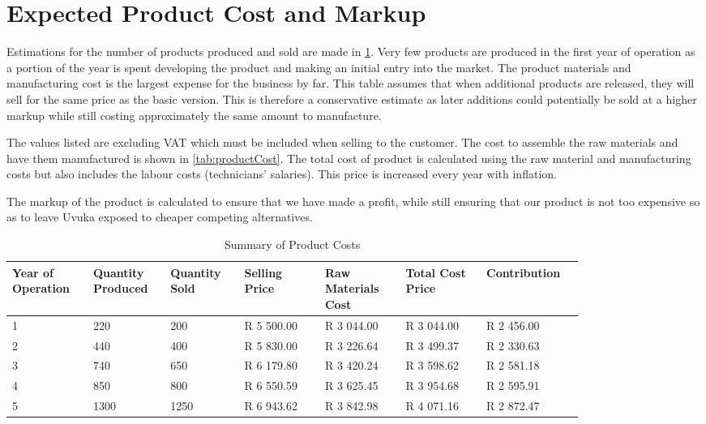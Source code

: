 \section{Expected Product Cost and Markup}
Estimations for the number of products produced and sold are made in \cref{tab:ProductSales}. Very few products are produced in the first year of operation as a portion of the year is spent developing the product and making an initial entry into the market. The product materials and manufacturing cost is the largest expense for the business by far. This table assumes that when additional products are released, they will sell for the same price as the basic version. This is therefore a conservative estimate as later additions could potentially be sold at a higher markup while still costing approximately the same amount to manufacture.

The values listed are excluding VAT which must be included when selling to the customer. The cost to assemble the raw materials and have them manufactured is shown in \cref{tab:productCost}. The total cost of product is calculated using the raw material and manufacturing costs but also includes the labour costs (technicians' salaries). This price is increased every year with inflation. 

The markup of the product is calculated to ensure that we have made a profit, while still ensuring that our product is not too expensive so as to leave Uvuka exposed to cheaper competing alternatives.

\begin{table}[htbp]
  \centering
  \caption{Summary of Product Costs}
    \begin{tabular}{p{0.12\linewidth}p{0.11\linewidth}p{0.11\linewidth}p{0.12\linewidth}p{0.12\linewidth}p{0.12\linewidth}p{0.12\linewidth}}
    \toprule
    \raggedright{Year of Operation} & Quantity Produced & Quantity Sold & Selling Price & Raw Materials Cost & \raggedright{Total Cost Price} & Contribution \\
    \midrule
    1     & 220   & 200   & R 5 500.00 & R 3 044.00 & R 3 044.00 & R 2 456.00 \\
    2     & 440   & 400   & R 5 830.00 & R 3 226.64 & R 3 499.37 & R 2 330.63 \\
    3     & 740   & 650   & R 6 179.80 & R 3 420.24 & R 3 598.62 & R 2 581.18 \\
    4     & 850   & 800   & R 6 550.59 & R 3 625.45 & R 3 954.68 & R 2 595.91 \\
    5     & 1300  & 1250  & R 6 943.62 & R 3 842.98 & R 4 071.16 & R 2 872.47 \\
    \bottomrule
    \end{tabular}%
  \label{tab:ProductSales}%
\end{table}%

